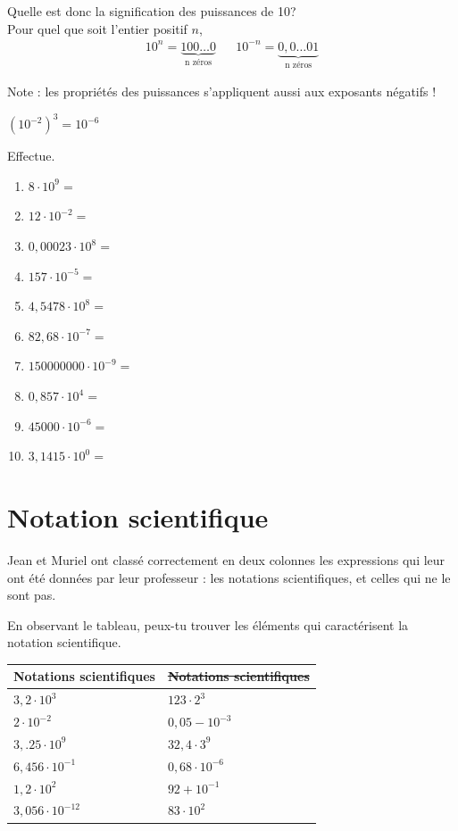 \documentclass[../math2.tex]{subfiles}
\begin{document}
Quelle est donc la signification des puissances de 10?\\
Pour quel que soit l'entier positif $n$,
\begin{align*}
	10^n=\underbrace{100\dots0}_{\text{n zéros}} &  &
	10^{-n}=\underbrace{0,0\dots01}_{\text{n zéros}}
\end{align*}

\begin{tcolorbox}
	Note : les propriétés des puissances s'appliquent aussi aux exposants négatifs !

	\exemple $\left(10^{-2}\right)^3 = 10^{-6}$
\end{tcolorbox}

\newpage
\begin{exercise}
	Effectue.
	\begin{enumerate} [cols=2]
		\item $8\cdot 10^9=$
		\item $12\cdot 10^{-2}=$
		\item $0,00023\cdot 10^8=$
		\item $157\cdot 10^{-5}=$
		\item $4,5478\cdot 10^8=$
		\item $82,68\cdot 10^{-7}=$
		\item $150000000\cdot 10^{-9}=$
		\item $0,857\cdot 10^4=$
		\item $45000\cdot 10^{-6}=$
		\item $3,1415 \cdot 10^0=$
	\end{enumerate}
\end{exercise}

\section{Notation scientifique}
Jean et Muriel ont classé correctement en deux colonnes les expressions qui leur ont été données par leur professeur : les notations scientifiques, et celles qui ne le sont pas.

En observant le tableau, peux-tu trouver les éléments qui caractérisent la notation scientifique.

\begin{center}
	\begin{tabularx}{.8\linewidth}{YY} %
		\toprule
		\textbf{Notations scientifiques} & \textbf{\sout{Notations scientifiques}} \\
		\midrule
		$3,2\cdot 10^3$                  & $123\cdot 2^3$                          \\
		$2\cdot 10^{-2}$                 & $0,05 - 10^{-3}$                        \\
		$3,.25\cdot 10^9$                & $32,4\cdot 3^9$                         \\
		$6,456 \cdot 10^{-1}$            & $0,68\cdot 10^{-6}$                     \\
		$1,2\cdot 10^2$                  & $92 + 10^{-1}$                          \\
		$3,056\cdot 10^{-12}$            & $83\cdot 10^2$                          \\
	\end{tabularx}
\end{center}
\end{document}
